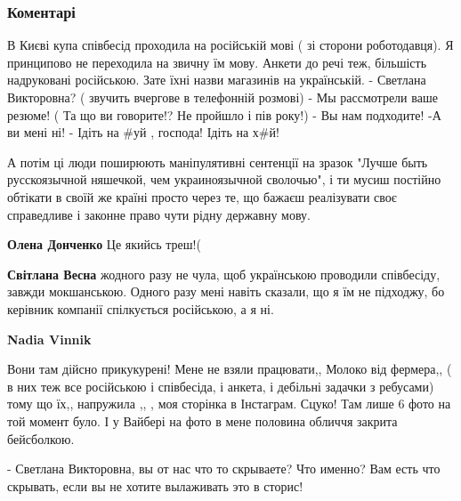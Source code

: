  
 
 
 
 
\subsubsection{Коментарі}
\label{sec:18_09_2021.fb.donchenko_elena.1.kurjer_mova.cmt}

\begin{itemize} %

\obeycr
В Києві купа співбесід проходила на російській мові ( зі сторони роботодавця). Я принципово не переходила на звичну їм мову. Анкети до речі теж, більшість надруковані російською. Зате їхні назви магазинів на українській.
- Светлана Викторовна? ( звучить вчергове в телефонній розмові)
- Мы рассмотрели ваше резюме! ( Та що ви говорите!? Не пройшло і пів року!)
- Вы нам подходите!
-А ви мені ні!
- Ідіть на \#уй , господа! Ідіть на х\#й!
\restorecr

\begin{itemize} %

А потім ці люди поширюють маніпулятивні сентенції на зразок "Лучше быть
русскоязычной няшечкой, чем украиноязычной сволочью", і ти мусиш постійно
обтікати в своїй же країні просто через те, що бажаєш реалізувати своє
справедливе і законне право чути рідну державну мову.


\textbf{Олена Донченко} Це якийсь треш!(

\textbf{Світлана Весна} жодного разу не чула, щоб українською проводили співбесіду, завжди мокшанською. Одного разу мені навіть сказали, що я їм не підходжу, бо керівник компанії спілкується російською, а я ні.

\textbf{Nadia Vinnik} 

Вони там дійсно прикукурені! Мене не взяли працювати,, Молоко від фермера,, ( в
них теж все російською і співбесіда, і анкета, і дебільні задачки з ребусами)
тому що їх,, напружила ,, , моя сторінка в Інстаграм. Сцуко! Там лише 6 фото на
той момент було. І у Вайбері на фото в мене половина обличчя закрита
бейсболкою.

- Светлана Викторовна, вы от нас что то скрываете? Что именно? Вам есть что
скрывать, если вы не хотите вылаживать это в сторис!


\end{itemize}
\end{itemize}
